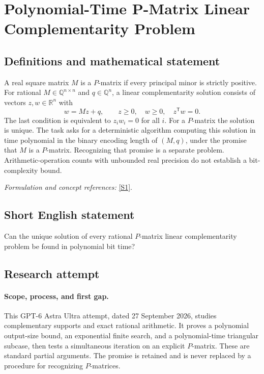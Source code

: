 \documentclass[11pt]{article}
\begin{document}
\section*{\texorpdfstring{Polynomial-Time P-Matrix Linear Complementarity Problem}{Polynomial-Time P-Matrix Linear Complementarity Problem}}\label{30006923}
\subsection{Definitions and mathematical statement}
A real square matrix $M$ is a $P$-matrix if every principal minor is strictly positive. For rational $M\in{\mathbb{Q}}^{n\times n}$ and $q\in{\mathbb{Q}}^n$, a linear complementarity solution consists of vectors $z,w\in{\mathbb{R}}^n$ with
\[
 w=Mz+q,\qquad z\ge0,\quad w\ge0,\quad z^{\mathsf T}w=0.
\]
The last condition is equivalent to $z_iw_i=0$ for all $i$. For a $P$-matrix the solution is unique. The task asks for a deterministic algorithm computing this solution in time polynomial in the binary encoding length of $(M,q)$, under the promise that $M$ is a $P$-matrix. Recognizing that promise is a separate problem. Arithmetic-operation counts with unbounded real precision do not establish a bit-complexity bound.
\par\smallskip\textit{Formulation and concept references:} \href{https://arxiv.org/abs/2008.08992}{[S1]}.

\subsection{Short English statement}
Can the unique solution of every rational $P$-matrix linear complementarity problem be found in polynomial bit time?
\subsection{Research attempt}
\paragraph{Scope, process, and first gap.}
This GPT-6 Astra Ultra attempt, dated 27 September 2026, studies complementary supports and exact rational arithmetic. It proves a polynomial output-size bound, an exponential finite search, and a polynomial-time triangular subcase, then tests a simultaneous iteration on an explicit $P$-matrix. These are standard partial arguments. The promise is retained and is never replaced by a procedure for recognizing $P$-matrices.
\end{document}
